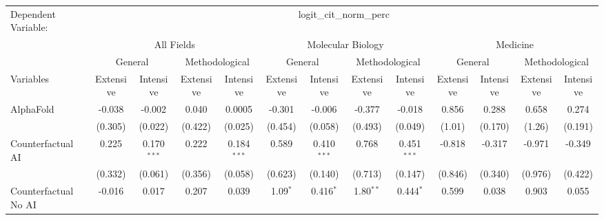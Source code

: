\begingroup
\centering
\begin{tabular}{lcccccccccccc}
   \tabularnewline \midrule \midrule
   Dependent Variable: & \multicolumn{12}{c}{logit\_cit\_norm\_perc}\\
 & \multicolumn{4}{c}{All Fields} & \multicolumn{4}{c}{Molecular Biology} & \multicolumn{4}{c}{Medicine} \\
\cmidrule(lr){2-5} \cmidrule(lr){6-9} \cmidrule(lr){10-13}
 & \multicolumn{2}{c}{General} & \multicolumn{2}{c}{Methodological} & \multicolumn{2}{c}{General} & \multicolumn{2}{c}{Methodological} & \multicolumn{2}{c}{General} & \multicolumn{2}{c}{Methodological} \\
\cmidrule(lr){2-3} \cmidrule(lr){4-5} \cmidrule(lr){6-7} \cmidrule(lr){8-9} \cmidrule(lr){10-11} \cmidrule(lr){12-13}
Variables & \multicolumn{1}{c}{Extensive} & \multicolumn{1}{c}{Intensive} & \multicolumn{1}{c}{Extensive} & \multicolumn{1}{c}{Intensive} & \multicolumn{1}{c}{Extensive} & \multicolumn{1}{c}{Intensive} & \multicolumn{1}{c}{Extensive} & \multicolumn{1}{c}{Intensive} & \multicolumn{1}{c}{Extensive} & \multicolumn{1}{c}{Intensive} & \multicolumn{1}{c}{Extensive} & \multicolumn{1}{c}{Intensive} \\
\cmidrule(lr){1-1}\cmidrule(lr){2-2} \cmidrule(lr){3-3} \cmidrule(lr){4-4} \cmidrule(lr){5-5} \cmidrule(lr){6-6} \cmidrule(lr){7-7} \cmidrule(lr){8-8} \cmidrule(lr){9-9} \cmidrule(lr){10-10} \cmidrule(lr){11-11} \cmidrule(lr){12-12} \cmidrule(lr){13-13}
   AlphaFold                                & -0.038  & -0.002        & 0.040   & 0.0005        & -0.301     & -0.006        & -0.377      & -0.018         & 0.856   & 0.288   & 0.658   & 0.274\\   
                                            & (0.305) & (0.022)       & (0.422) & (0.025)       & (0.454)    & (0.058)       & (0.493)     & (0.049)        & (1.01)  & (0.170) & (1.26)  & (0.191)\\   
   Counterfactual AI                        & 0.225   & 0.170$^{***}$ & 0.222   & 0.184$^{***}$ & 0.589      & 0.410$^{***}$ & 0.768       & 0.451$^{***}$  & -0.818  & -0.317  & -0.971  & -0.349\\   
                                            & (0.332) & (0.061)       & (0.356) & (0.058)       & (0.623)    & (0.140)       & (0.713)     & (0.147)        & (0.846) & (0.340) & (0.976) & (0.422)\\   
   Counterfactual No AI                     & -0.016  & 0.017         & 0.207   & 0.039         & 1.09$^{*}$ & 0.416$^{*}$   & 1.80$^{**}$ & 0.444$^{*}$    & 0.599   & 0.038   & 0.903   & 0.055\\   

\end{tabular}
